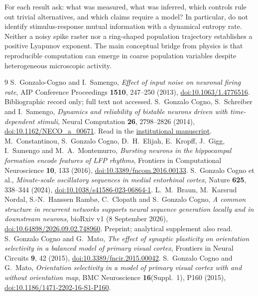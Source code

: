 \documentclass[11pt,a4paper]{article}
\begin{document}
For each result ask: what was measured, what was inferred, which controls rule out trivial alternatives, and which claims require a model? In particular, do not identify stimulus-response mutual information with a dynamical entropy rate. Neither a noisy spike raster nor a ring-shaped population trajectory establishes a positive Lyapunov exponent. The main conceptual bridge from physics is that reproducible computation can emerge in coarse population variables despite heterogeneous microscopic activity.

\begin{thebibliography}{9}
 S.~Gonzalo-Cogno and I.~Samengo, \emph{Effect of input noise on neuronal firing rate}, AIP Conference Proceedings \textbf{1510}, 247--250 (2013), \href{https://doi.org/10.1063/1.4776516}{doi:10.1063/1.4776516}. Bibliographic record only; full text not accessed.
 S.~Gonzalo Cogno, S.~Schreiber and I.~Samengo, \emph{Dynamics and reliability of bistable neurons driven with time-dependent stimuli}, Neural Computation \textbf{26}, 2798--2826 (2014), \href{https://doi.org/10.1162/NECO_a_00671}{doi:10.1162/NECO\_a\_00671}. Read in the \href{https://ri.conicet.gov.ar/handle/11336/21388}{institutional manuscript}.
 M.~Constantinou, S.~Gonzalo Cogno, D.~H.~Elijah, E.~Kropff, J.~Gigg, I.~Samengo and M.~A.~Montemurro, \emph{Bursting neurons in the hippocampal formation encode features of LFP rhythms}, Frontiers in Computational Neuroscience \textbf{10}, 133 (2016), \href{https://doi.org/10.3389/fncom.2016.00133}{doi:10.3389/fncom.2016.00133}.
 S.~Gonzalo Cogno et al., \emph{Minute-scale oscillatory sequences in medial entorhinal cortex}, Nature \textbf{625}, 338--344 (2024), \href{https://doi.org/10.1038/s41586-023-06864-1}{doi:10.1038/s41586-023-06864-1}.
 L.~M.~Braun, M.~Karsrud Nordal, S.-N.~Hanssen Ramb{\o}, C.~Clopath and S.~Gonzalo Cogno, \emph{A common structure in recurrent networks supports neural sequence generation locally and in downstream neurons}, bioRxiv v1 (8 September 2026), \href{https://doi.org/10.64898/2026.09.02.748960}{doi:10.64898/2026.09.02.748960}. Preprint; analytical supplement also read.
 S.~Gonzalo Cogno and G.~Mato, \emph{The effect of synaptic plasticity on orientation selectivity in a balanced model of primary visual cortex}, Frontiers in Neural Circuits \textbf{9}, 42 (2015), \href{https://doi.org/10.3389/fncir.2015.00042}{doi:10.3389/fncir.2015.00042}.
 S.~Gonzalo Cogno and G.~Mato, \emph{Orientation selectivity in a model of primary visual cortex with and without orientation map}, BMC Neuroscience \textbf{16}(Suppl.~1), P160 (2015), \href{https://doi.org/10.1186/1471-2202-16-S1-P160}{doi:10.1186/1471-2202-16-S1-P160}.

\end{thebibliography}
\end{document}
